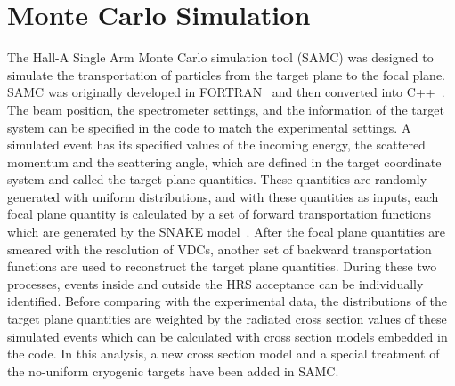 \section{Monte Carlo Simulation}
 The Hall-A Single Arm Monte Carlo simulation tool (SAMC) was designed to simulate the transportation of particles from the target plane to the focal plane. SAMC was originally developed in FORTRAN~\cite{A_Duer} and then converted into C++~\cite{hyao_thesis}. The beam position, the spectrometer settings, and the information of the target system can be specified in the code to match the experimental settings. A simulated event has its specified values of the incoming energy, the scattered momentum and the scattering angle, which are defined in the target coordinate system and called the target plane quantities. These quantities are randomly generated with uniform distributions, and with these quantities as inputs, each focal plane quantity is calculated by a set of forward transportation functions which are generated by the SNAKE model~\cite{snack_lerose}. After the focal plane quantities are smeared with the resolution of VDCs, another set of backward transportation functions are used to reconstruct the target plane quantities. During these two processes, events inside and outside the HRS acceptance can be individually identified. Before comparing with the experimental data, the distributions of the target plane quantities are weighted by the radiated cross section values of these simulated events which can be calculated with cross section models embedded in the code. In this analysis, a new cross section model and a special treatment of the no-uniform cryogenic targets have been added in SAMC.

